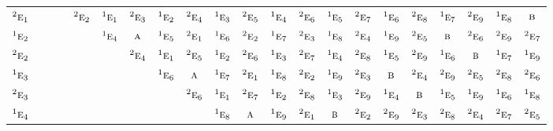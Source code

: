 \documentclass[10pt,a4paper]{article}
\numberwithin{equation}{section}
\newcommand{\irr}[1]{\text{\normalfont\scshape #1}}
\newcommand{\conjpair}[1]{{}^{#1}}
\begin{document}
{\begin{longtable}{@{}lcccccccccccccccccccc@{}}
$\conjpair{2}\irr{e}_{1}$ &  &  &  & $\conjpair{2}\irr{e}_{2}$ & $\conjpair{1}\irr{e}_{1}$ & $\conjpair{2}\irr{e}_{3}$ & $\conjpair{1}\irr{e}_{2}$ & $\conjpair{2}\irr{e}_{4}$ & $\conjpair{1}\irr{e}_{3}$ & $\conjpair{2}\irr{e}_{5}$ & $\conjpair{1}\irr{e}_{4}$ & $\conjpair{2}\irr{e}_{6}$ & $\conjpair{1}\irr{e}_{5}$ & $\conjpair{2}\irr{e}_{7}$ & $\conjpair{1}\irr{e}_{6}$ & $\conjpair{2}\irr{e}_{8}$ & $\conjpair{1}\irr{e}_{7}$ & $\conjpair{2}\irr{e}_{9}$ & $\conjpair{1}\irr{e}_{8}$ & $\irr{b}$\\
$\conjpair{1}\irr{e}_{2}$ &  &  &  &  & $\conjpair{1}\irr{e}_{4}$ & $\irr{a}$ & $\conjpair{1}\irr{e}_{5}$ & $\conjpair{2}\irr{e}_{1}$ & $\conjpair{1}\irr{e}_{6}$ & $\conjpair{2}\irr{e}_{2}$ & $\conjpair{1}\irr{e}_{7}$ & $\conjpair{2}\irr{e}_{3}$ & $\conjpair{1}\irr{e}_{8}$ & $\conjpair{2}\irr{e}_{4}$ & $\conjpair{1}\irr{e}_{9}$ & $\conjpair{2}\irr{e}_{5}$ & $\irr{b}$ & $\conjpair{2}\irr{e}_{6}$ & $\conjpair{2}\irr{e}_{9}$ & $\conjpair{2}\irr{e}_{7}$\\
$\conjpair{2}\irr{e}_{2}$ &  &  &  &  &  & $\conjpair{2}\irr{e}_{4}$ & $\conjpair{1}\irr{e}_{1}$ & $\conjpair{2}\irr{e}_{5}$ & $\conjpair{1}\irr{e}_{2}$ & $\conjpair{2}\irr{e}_{6}$ & $\conjpair{1}\irr{e}_{3}$ & $\conjpair{2}\irr{e}_{7}$ & $\conjpair{1}\irr{e}_{4}$ & $\conjpair{2}\irr{e}_{8}$ & $\conjpair{1}\irr{e}_{5}$ & $\conjpair{2}\irr{e}_{9}$ & $\conjpair{1}\irr{e}_{6}$ & $\irr{b}$ & $\conjpair{1}\irr{e}_{7}$ & $\conjpair{1}\irr{e}_{9}$\\
$\conjpair{1}\irr{e}_{3}$ &  &  &  &  &  &  & $\conjpair{1}\irr{e}_{6}$ & $\irr{a}$ & $\conjpair{1}\irr{e}_{7}$ & $\conjpair{2}\irr{e}_{1}$ & $\conjpair{1}\irr{e}_{8}$ & $\conjpair{2}\irr{e}_{2}$ & $\conjpair{1}\irr{e}_{9}$ & $\conjpair{2}\irr{e}_{3}$ & $\irr{b}$ & $\conjpair{2}\irr{e}_{4}$ & $\conjpair{2}\irr{e}_{9}$ & $\conjpair{2}\irr{e}_{5}$ & $\conjpair{2}\irr{e}_{8}$ & $\conjpair{2}\irr{e}_{6}$\\
$\conjpair{2}\irr{e}_{3}$ &  &  &  &  &  &  &  & $\conjpair{2}\irr{e}_{6}$ & $\conjpair{1}\irr{e}_{1}$ & $\conjpair{2}\irr{e}_{7}$ & $\conjpair{1}\irr{e}_{2}$ & $\conjpair{2}\irr{e}_{8}$ & $\conjpair{1}\irr{e}_{3}$ & $\conjpair{2}\irr{e}_{9}$ & $\conjpair{1}\irr{e}_{4}$ & $\irr{b}$ & $\conjpair{1}\irr{e}_{5}$ & $\conjpair{1}\irr{e}_{9}$ & $\conjpair{1}\irr{e}_{6}$ & $\conjpair{1}\irr{e}_{8}$\\
$\conjpair{1}\irr{e}_{4}$ &  &  &  &  &  &  &  &  & $\conjpair{1}\irr{e}_{8}$ & $\irr{a}$ & $\conjpair{1}\irr{e}_{9}$ & $\conjpair{2}\irr{e}_{1}$ & $\irr{b}$ & $\conjpair{2}\irr{e}_{2}$ & $\conjpair{2}\irr{e}_{9}$ & $\conjpair{2}\irr{e}_{3}$ & $\conjpair{2}\irr{e}_{8}$ & $\conjpair{2}\irr{e}_{4}$ & $\conjpair{2}\irr{e}_{7}$ & $\conjpair{2}\irr{e}_{5}$\\

\end{longtable}}
\end{document}
